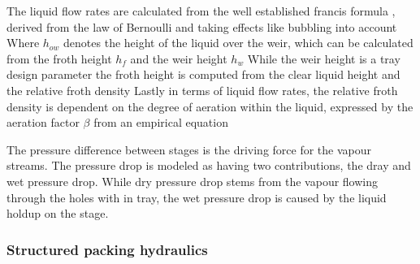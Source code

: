         The liquid flow rates are calculated from the well established francis formula ,
        derived from the law of Bernoulli and taking effects like bubbling into account
        Where $h_{ow}$ denotes the height of the liquid over the weir, which can be calculated from the
        froth height $h_f$ and the weir height $h_w$
        While the weir height is a tray design parameter the froth height is computed from the clear
        liquid height and the relative froth density
        Lastly in terms of liquid flow rates, the relative froth density is dependent on the
        degree of aeration within the liquid, expressed by the aeration factor $\beta$
        from an empirical equation

        The pressure difference between stages is the driving force for the vapour streams. The pressure drop
        is modeled as having two contributions, the dray and wet pressure drop. While dry pressure drop
        stems from the vapour flowing through the holes with in tray, the wet pressure drop is caused by the liquid
        holdup on the stage.

    \subsubsection{Structured packing hydraulics}
    \label{sec:mathpro:dynamic:strpackhyd}
        \begin{figure}
            
        \end{figure}

